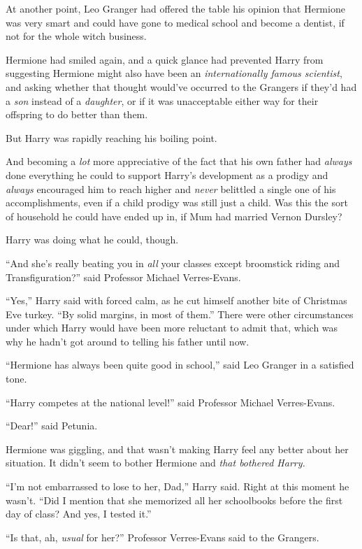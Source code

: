 At another point, Leo Granger had offered the table his opinion that Hermione was very smart and could have gone to medical school and become a dentist, if not for the whole witch business.

Hermione had smiled again, and a quick glance had prevented Harry from suggesting Hermione might also have been an \emph{internationally famous scientist}, and asking whether that thought would’ve occurred to the Grangers if they’d had a \emph{son} instead of a \emph{daughter}, or if it was unacceptable either way for their offspring to do better than them.

But Harry was rapidly reaching his boiling point.

And becoming a \emph{lot} more appreciative of the fact that his own father had \emph{always} done everything he could to support Harry’s development as a prodigy and \emph{always} encouraged him to reach higher and \emph{never} belittled a single one of his accomplishments, even if a child prodigy was still just a child. Was this the sort of household he could have ended up in, if Mum had married Vernon Dursley?

Harry was doing what he could, though.

“And she’s really beating you in \emph{all} your classes except broomstick riding and Transfiguration?” said Professor Michael Verres-Evans.

“Yes,” Harry said with forced calm, as he cut himself another bite of Christmas Eve turkey. “By solid margins, in most of them.” There were other circumstances under which Harry would have been more reluctant to admit that, which was why he hadn’t got around to telling his father until now.

“Hermione has always been quite good in school,” said Leo Granger in a satisfied tone.

“Harry competes at the national level!” said Professor Michael Verres-Evans.

“Dear!” said Petunia.

Hermione was giggling, and that wasn’t making Harry feel any better about her situation. It didn’t seem to bother Hermione and \emph{that bothered Harry.}

“I’m not embarrassed to lose to her, Dad,” Harry said. Right at this moment he wasn’t. “Did I mention that she memorized all her schoolbooks before the first day of class? And yes, I tested it.”

“Is that, ah, \emph{usual} for her?” Professor Verres-Evans said to the Grangers.

